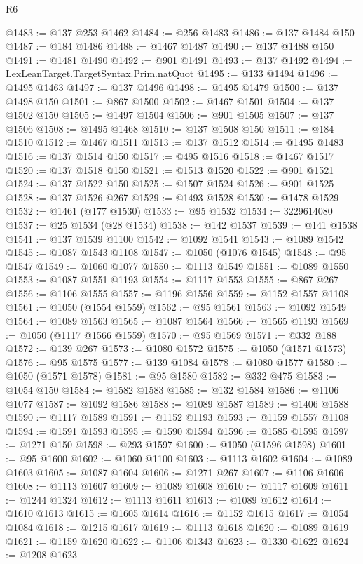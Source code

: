 \begin{lexlean}{R6}
\begin{coremodule}
@1483 := @137 @253 @1462
@1484 := @256 @1483
@1486 := @137 @1484 @150
@1487 := @184 @1486
@1488 := @1467 @1487
@1490 := @137 @1488 @150
@1491 := @1481 @1490
@1492 := @901 @1491
@1493 := @137 @1492
@1494 := LexLeanTarget.TargetSyntax.Prim.natQuot
@1495 := @133 @1494
@1496 := @1495 @1463
@1497 := @137 @1496
@1498 := @1495 @1479
@1500 := @137 @1498 @150
@1501 := @867 @1500
@1502 := @1467 @1501
@1504 := @137 @1502 @150
@1505 := @1497 @1504
@1506 := @901 @1505
@1507 := @137 @1506
@1508 := @1495 @1468
@1510 := @137 @1508 @150
@1511 := @184 @1510
@1512 := @1467 @1511
@1513 := @137 @1512
@1514 := @1495 @1483
@1516 := @137 @1514 @150
@1517 := @495 @1516
@1518 := @1467 @1517
@1520 := @137 @1518 @150
@1521 := @1513 @1520
@1522 := @901 @1521
@1524 := @137 @1522 @150
@1525 := @1507 @1524
@1526 := @901 @1525
@1528 := @137 @1526 @267
@1529 := @1493 @1528
@1530 := @1478 @1529
@1532 := @1461 (@177 @1530)
@1533 := @95 @1532
@1534 := 3229614080
@1537 := @25 @1534 (@28 @1534)
@1538 := @142 @1537
@1539 := @141 @1538
@1541 := @137 @1539 @1100
@1542 := @1092 @1541
@1543 := @1089 @1542
@1545 := @1087 @1543 @1108
@1547 := @1050 (@1076 @1545)
@1548 := @95 @1547
@1549 := @1060 @1077
@1550 := @1113 @1549
@1551 := @1089 @1550
@1553 := @1087 @1551 @1193
@1554 := @1117 @1553
@1555 := @867 @267
@1556 := @1106 @1555
@1557 := @1196 @1556
@1559 := @1152 @1557 @1108
@1561 := @1050 (@1554 @1559)
@1562 := @95 @1561
@1563 := @1092 @1549
@1564 := @1089 @1563
@1565 := @1087 @1564
@1566 := @1565 @1193
@1569 := @1050 (@1117 @1566 @1559)
@1570 := @95 @1569
@1571 := @332 @188
@1572 := @139 @267
@1573 := @1080 @1572
@1575 := @1050 (@1571 @1573)
@1576 := @95 @1575
@1577 := @139 @1084
@1578 := @1080 @1577
@1580 := @1050 (@1571 @1578)
@1581 := @95 @1580
@1582 := @332 @475
@1583 := @1054 @150
@1584 := @1582 @1583
@1585 := @132 @1584
@1586 := @1106 @1077
@1587 := @1092 @1586
@1588 := @1089 @1587
@1589 := @1406 @1588
@1590 := @1117 @1589
@1591 := @1152 @1193
@1593 := @1159 @1557 @1108
@1594 := @1591 @1593
@1595 := @1590 @1594
@1596 := @1585 @1595
@1597 := @1271 @150
@1598 := @293 @1597
@1600 := @1050 (@1596 @1598)
@1601 := @95 @1600
@1602 := @1060 @1100
@1603 := @1113 @1602
@1604 := @1089 @1603
@1605 := @1087 @1604
@1606 := @1271 @267
@1607 := @1106 @1606
@1608 := @1113 @1607
@1609 := @1089 @1608
@1610 := @1117 @1609
@1611 := @1244 @1324
@1612 := @1113 @1611
@1613 := @1089 @1612
@1614 := @1610 @1613
@1615 := @1605 @1614
@1616 := @1152 @1615
@1617 := @1054 @1084
@1618 := @1215 @1617
@1619 := @1113 @1618
@1620 := @1089 @1619
@1621 := @1159 @1620
@1622 := @1106 @1343
@1623 := @1330 @1622
@1624 := @1208 @1623

\end{coremodule}
\end{lexlean}
